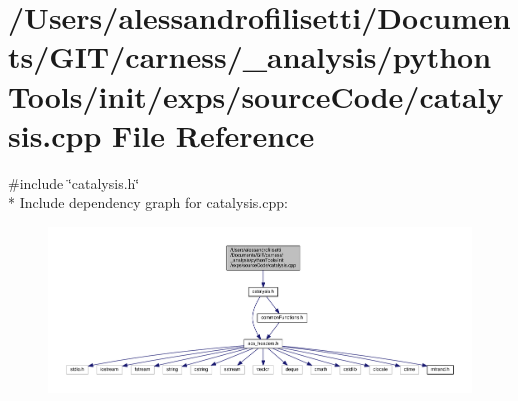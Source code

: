 \hypertarget{a00052}{\section{/\+Users/alessandrofilisetti/\+Documents/\+G\+I\+T/carness/\+\_\+analysis/python\+Tools/init/exps/source\+Code/catalysis.cpp File Reference}
\label{a00052}
}
{\ttfamily \#include \char`\"{}catalysis.\+h\char`\"{}}\\*
Include dependency graph for catalysis.\+cpp\+:\nopagebreak
\begin{figure}[H]
\begin{center}
\leavevmode
\includegraphics[width=350pt]{a00166}
\end{center}
\end{figure}
